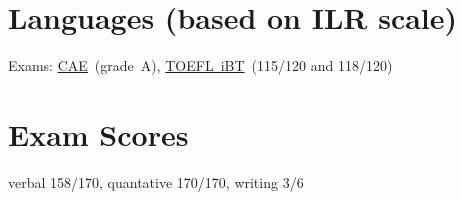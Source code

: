 \documentclass[11pt,a4paper,oneside,roman]{moderncv}
\begin{document}
\section{Languages \small{(based on ILR scale)}}
  {Exams:
    \href{http://www.cambridgeenglish.org/exams/advanced/}{CAE}~(grade~A),
    \href{http://www.ets.org/toefl}{TOEFL~iBT}~(115/120 and 118/120)
  }

\section{Exam Scores}
        {verbal 158/170, quantative 170/170, writing 3/6}
        {}{}{}

\end{document}
